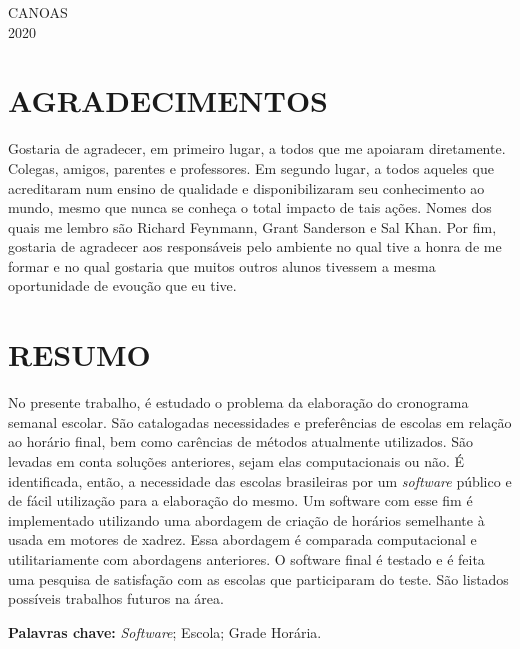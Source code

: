 \documentclass[12pt,a4paper]{article}
\newenvironment{bottompar}{\par\vspace*{\fill}}{\clearpage}
\begin{document}
	\begin{bottompar}
		\begin{center}
			CANOAS \\
			2020
		\end{center}
	\end{bottompar}


	\thispagestyle{empty}
	\section*{AGRADECIMENTOS}

	Gostaria de agradecer, em primeiro lugar, a todos que me apoiaram diretamente. Colegas, amigos, parentes e professores. Em segundo lugar, a todos aqueles que acreditaram num ensino de qualidade e disponibilizaram seu conhecimento ao mundo, mesmo que nunca se conheça o total impacto de tais ações. Nomes dos quais me lembro são Richard Feynmann, Grant Sanderson e Sal Khan. Por fim, gostaria de agradecer aos responsáveis pelo ambiente no qual tive a honra de me formar e no qual gostaria que muitos outros alunos tivessem a mesma oportunidade de evoução que eu tive.

	\newpage


	\thispagestyle{empty}
	\section*{RESUMO}

	No presente trabalho, é estudado o problema da elaboração do cronograma semanal escolar. São catalogadas necessidades e preferências de escolas em relação ao horário final, bem como carências de métodos atualmente utilizados. São levadas em conta soluções anteriores, sejam elas computacionais ou não. É identificada, então, a necessidade das escolas brasileiras por um \textit{software} público e de fácil utilização para a elaboração do mesmo. Um software com esse fim é implementado utilizando uma abordagem de criação de horários semelhante à usada em motores de xadrez. Essa abordagem é comparada	computacional e utilitariamente com abordagens anteriores. O software final é testado e é feita uma pesquisa de satisfação com as escolas que participaram do teste. São listados possíveis trabalhos futuros na área.

	\begingroup
		\setlength{\parindent}{0mm}
		\textbf{Palavras chave:} \textit{Software}; Escola; Grade Horária.
	\endgroup
	\newpage
\end{document}
